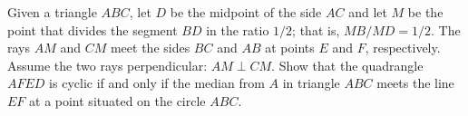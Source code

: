 Given a triangle $ABC$, let $D$ be the midpoint of the side $AC$ and let $M$ be the point that divides the segment $BD$ in the ratio $1/2$; that is, $MB/MD=1/2$. The rays $AM$ and $CM$ meet the sides $BC$ and $AB$ at points $E$ and $F$, respectively. Assume the two rays perpendicular: $AM\perp CM$. Show that the quadrangle $AFED$ is cyclic if and only if the median from $A$ in triangle $ABC$ meets the line $EF$ at a point situated on the circle $ABC$.